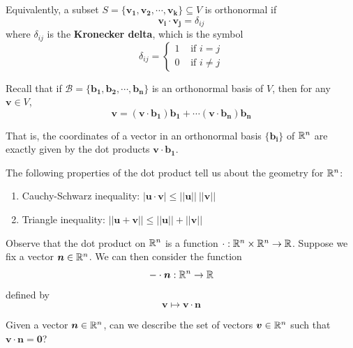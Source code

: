 \begin{proposition}
        Equivalently, a subset $S = \{\bm{v_1}, \bm{v_2}, \cdots, \bm{v_k}\} \subseteq V$ is orthonormal if $$\bm{v_i} \cdot \bm{v_j} = \delta_{ij}$$ 
        where $\delta_{ij}$ is the \textbf{Kronecker delta}, which is the symbol $$\delta_{ij} = \left\{
		\begin{array}{ll}
			1 & \text{ if } i = j \\
			0 & \text{ if } i \neq j
		\end{array}
		\right.$$
    \end{proposition}


\begin{proposition}\label{coeffdotprod}
    Recall that if $\mathscr{B} = \{\bm{b_1}, \bm{b_2}, \cdots, \bm{b_n}\}$ is an orthonormal basis of $V$, then for any $\bm{v} \in V$, $$\bm{v} = (\bm{v}\cdot \bm{b_1}) \bm{b_1} + \cdots (\bm{v}\cdot \bm{b_n})  \bm{b_n}$$ 
    \end{proposition}

That is, the coordinates of a vector in an orthonormal basis $\{\bm{b_i}\}$ of $\mathbb{R}^n$ are exactly given by the dot products $\bm{v}\cdot \bm{b_1}$.


\begin{theorem}
    
    The following properties of the dot product tell us about the geometry for $\mathbb{R}^n$:
    
    \begin{enumerate}
        \item Cauchy-Schwarz inequality: $| \bm{u} \cdot \bm{v} | \leq  || \bm{u}|| \ || \bm{v} ||$
        \item Triangle inequality: $|| \bm{u}+ \bm{v} || \leq  || \bm{u}|| +|| \bm{v} ||$
    \end{enumerate}
    
    \end{theorem}



Observe that the dot product on $\mathbb{R}^n$ is a function $\cdot: \mathbb{R}^n \times \mathbb{R}^n \to \mathbb{R}$.  Suppose we fix a vector $\bm{n} \in \mathbb{R}^n$.  We can then consider the function $$- \cdot \bm{n} : \mathbb{R}^n\to \mathbb{R}$$ defined by $$\bm{v} \mapsto \bm{v} \cdot \bm{n}$$


\begin{motivating}
Given a vector $\bm{n} \in \mathbb{R}^n$, can we describe the set of vectors $\bm{v} \in \mathbb{R}^n$ such that $\bm{v} \cdot \bm{n} = \bm{0}$?
\end{motivating}

